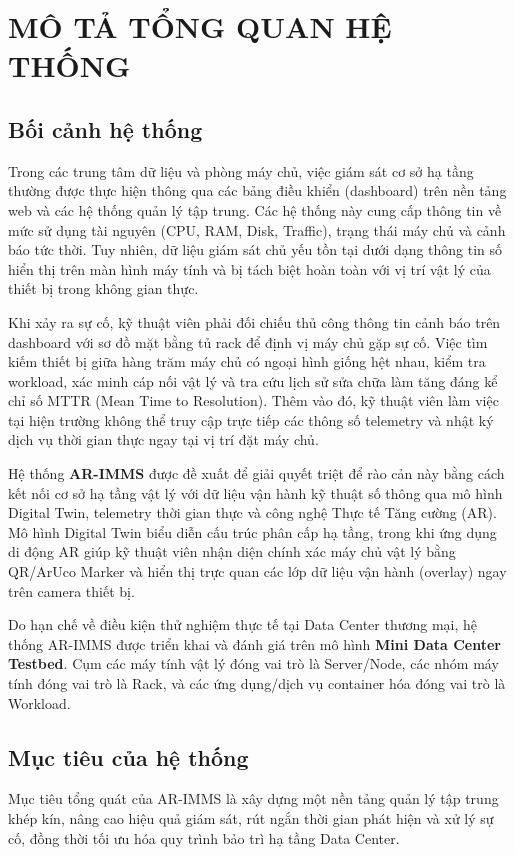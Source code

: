 \chapter{MÔ TẢ TỔNG QUAN HỆ THỐNG}

\section{Bối cảnh hệ thống}
Trong các trung tâm dữ liệu và phòng máy chủ, việc giám sát cơ sở hạ tầng thường được thực hiện thông qua các bảng điều khiển (dashboard) trên nền tảng web và các hệ thống quản lý tập trung. Các hệ thống này cung cấp thông tin về mức sử dụng tài nguyên (CPU, RAM, Disk, Traffic), trạng thái máy chủ và cảnh báo tức thời. Tuy nhiên, dữ liệu giám sát chủ yếu tồn tại dưới dạng thông tin số hiển thị trên màn hình máy tính và bị tách biệt hoàn toàn với vị trí vật lý của thiết bị trong không gian thực.

Khi xảy ra sự cố, kỹ thuật viên phải đối chiếu thủ công thông tin cảnh báo trên dashboard với sơ đồ mặt bằng tủ rack để định vị máy chủ gặp sự cố. Việc tìm kiếm thiết bị giữa hàng trăm máy chủ có ngoại hình giống hệt nhau, kiểm tra workload, xác minh cáp nối vật lý và tra cứu lịch sử sửa chữa làm tăng đáng kể chỉ số MTTR (Mean Time to Resolution). Thêm vào đó, kỹ thuật viên làm việc tại hiện trường không thể truy cập trực tiếp các thông số telemetry và nhật ký dịch vụ thời gian thực ngay tại vị trí đặt máy chủ.

Hệ thống \textbf{AR-IMMS} được đề xuất để giải quyết triệt để rào cản này bằng cách kết nối cơ sở hạ tầng vật lý với dữ liệu vận hành kỹ thuật số thông qua mô hình Digital Twin, telemetry thời gian thực và công nghệ Thực tế Tăng cường (AR). Mô hình Digital Twin biểu diễn cấu trúc phân cấp hạ tầng, trong khi ứng dụng di động AR giúp kỹ thuật viên nhận diện chính xác máy chủ vật lý bằng QR/ArUco Marker và hiển thị trực quan các lớp dữ liệu vận hành (overlay) ngay trên camera thiết bị.

Do hạn chế về điều kiện thử nghiệm thực tế tại Data Center thương mại, hệ thống AR-IMMS được triển khai và đánh giá trên mô hình \textbf{Mini Data Center Testbed}. Cụm các máy tính vật lý đóng vai trò là Server/Node, các nhóm máy tính đóng vai trò là Rack, và các ứng dụng/dịch vụ container hóa đóng vai trò là Workload.

\section{Mục tiêu của hệ thống}
Mục tiêu tổng quát của AR-IMMS là xây dựng một nền tảng quản lý tập trung khép kín, nâng cao hiệu quả giám sát, rút ngắn thời gian phát hiện và xử lý sự cố, đồng thời tối ưu hóa quy trình bảo trì hạ tầng Data Center.

